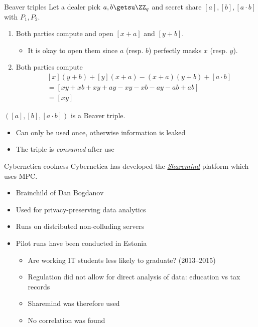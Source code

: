 \begin{frame}{Beaver triples}
  Let a dealer pick $a, b \getsu \ZZ_q$ and secret share $[a], [b], [a \cdot b]$ with $P_1, P_2$.
  \begin{enumerate}[<+(1)->]
    \item Both parties compute and open $[x + a]$ and $[y + b]$.
    \begin{itemize}
      \item It is okay to open them since $a$ (resp. $b$) perfectly masks $x$ (resp. $y$).
    \end{itemize}
    \item Both parties compute
    \begin{align*}
      &[x](y + b) + [y](x + a) - (x+a)(y+b) + [a\cdot b]\\
      &= [xy + xb + xy + ay - xy - xb - ay - ab + ab]\\
      &= [xy]
    \end{align*}
  \end{enumerate}
  \vspace*{-1em}
  \pause
  $([a], [b], [a \cdot b])$ is a Beaver triple.
  \begin{itemize}[<+(1)->]
    \item Can only be used once, otherwise information is leaked
    \item The triple is \emph{consumed} after use
  \end{itemize}
\end{frame}

\begin{frame}{Cybernetica coolness}
  Cybernetica has developed the \href{https://sharemind.cyber.ee}{\textit{Sharemind}} platform which uses MPC.
  \begin{itemize}[<+(1)->]
    \item Brainchild of Dan Bogdanov
    \item Used for privacy-preserving data analytics
    \item Runs on distributed non-colluding servers
    \item Pilot runs have been conducted in Estonia
    \par
    \begin{itemize}
      \item Are working IT students less likely to graduate? (2013--2015)
      \item Regulation did not allow for direct analysis of data: education vs tax records
      \item Sharemind was therefore used 
      \item No correlation was found
    \end{itemize}
  \end{itemize}
\end{frame}

